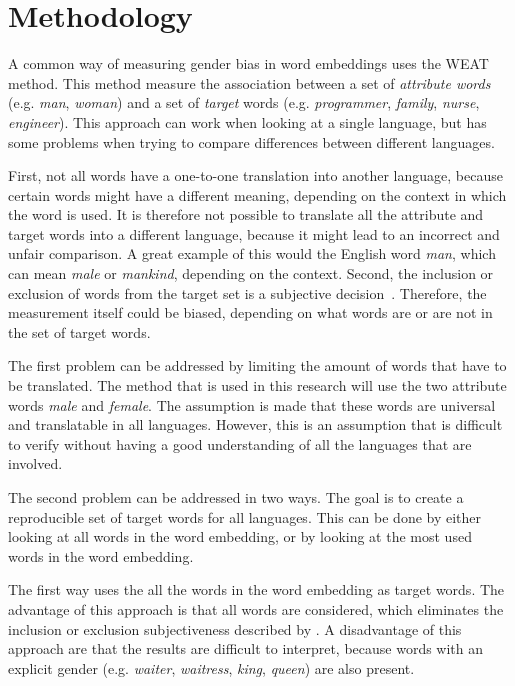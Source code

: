 \section{Methodology}
A common way of measuring gender bias in word embeddings uses the 
WEAT~\parencite{caliskan_2017_semantics_language_corpora} method. This method measure the
association between a set of \textit{attribute words} (e.g. \textit{man}, \textit{woman}) 
and a set of \textit{target} words (e.g. \textit{programmer}, \textit{family}, \textit{nurse}, \textit{engineer}). This
approach can work when looking at a single language, but has some problems when 
trying to compare differences between
different languages. 

First, not all words have a one-to-one translation into another
language, because certain words might have a different meaning, depending on the
context in which the word is used. It is therefore not possible to translate all the
attribute and target words into a different language, because it might lead to an
incorrect and unfair comparison. A great example of this would the English word
\textit{man}, which can mean \textit{male} or \textit{mankind}, depending on the context.
Second, the inclusion or exclusion of words from
the target set is a subjective decision~\parencite{nissim_fair_is_better_2020}. Therefore,
the measurement itself could be biased, depending on what words are or are not in the set of target words.

The first problem can be addressed by limiting the amount of words that have to be
translated. The method that is used in this research will use the two attribute words 
\textit{male} and \textit{female}. The assumption is made that these words are universal
and translatable in all languages. However, this is an assumption that is difficult to
verify without having a good understanding of all the languages that are involved.

The second problem can be addressed in two ways. The goal is to create a reproducible
set of target words for all languages. This can be done by either looking at all words
in the
word embedding, or by looking at the most used words in the word embedding.

The first way uses the
all the words in the word embedding as target words. The advantage of this approach is 
that all words are considered, which eliminates the inclusion or exclusion subjectiveness
described by \textcite{nissim_fair_is_better_2020}. A disadvantage of this approach
are that the results are difficult to interpret, because words with an explicit
gender (e.g. \textit{waiter}, \textit{waitress}, \textit{king}, \textit{queen}) are also 
present.

